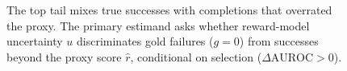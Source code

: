 \documentclass[11pt]{article}
\newcommand{\rhat}{\hat r}
\begin{document}
\begin{figure}[t]
\caption{The top tail mixes true successes with completions that overrated the
proxy. The primary estimand asks whether reward-model uncertainty $u$
discriminates gold failures ($g{=}0$) from successes beyond the proxy score
$\rhat$, conditional on selection ($\Delta\mathrm{AUROC}>0$).}
\label{fig:toptail}
\end{figure}
\end{document}
